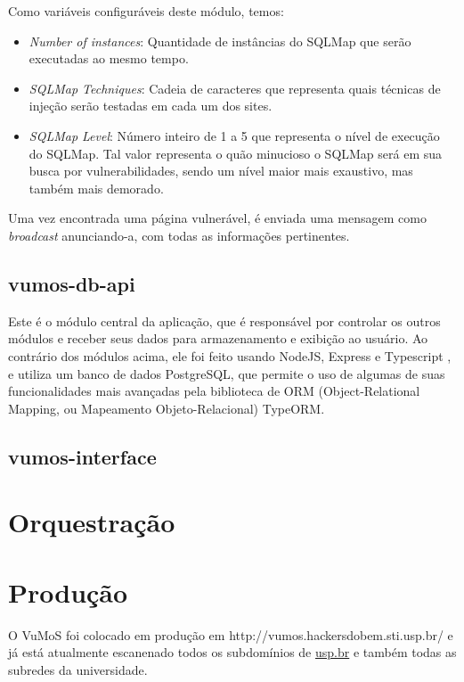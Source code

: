     Como variáveis configuráveis deste módulo, temos:
    \begin{itemize}
        \item \emph{Number of instances}: Quantidade de instâncias do SQLMap que serão executadas ao mesmo tempo.
        \item \emph{SQLMap Techniques}: Cadeia de caracteres que representa quais técnicas de injeção serão testadas em cada um dos sites.
        \item \emph{SQLMap Level}: Número inteiro de 1 a 5 que representa o nível de execução do SQLMap. Tal valor representa o quão minucioso o SQLMap será em sua busca por vulnerabilidades, sendo um nível maior mais exaustivo, mas também mais demorado.
    \end{itemize}
    
    Uma vez encontrada uma página vulnerável, é enviada uma mensagem como \textit{broadcast} anunciando-a, com todas as informações pertinentes.


    \subsection{vumos-db-api}
    
    Este é o módulo central da aplicação, que é responsável por controlar os outros módulos e receber seus dados para armazenamento e exibição ao usuário. Ao contrário dos módulos acima, ele foi feito usando NodeJS, Express e Typescript , e utiliza um banco de dados PostgreSQL, que permite o uso de algumas de suas funcionalidades mais avançadas pela biblioteca de ORM (Object-Relational Mapping, ou Mapeamento Objeto-Relacional) TypeORM. 
    
    \subsection{vumos-interface}
    

\section{Orquestração}
    

\section{Produção}
    O VuMoS foi colocado em produção em http://vumos.hackersdobem.sti.usp.br/ e já está atualmente escanenado todos os subdomínios de \url{usp.br} e também todas as subredes da universidade. 

